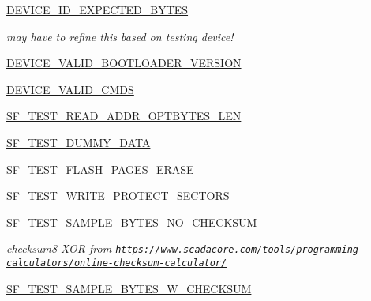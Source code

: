 \begin{DoxyCompactItemize}
\item 
\hyperlink{namespacestm__tools_1_1tests_1_1serialflasher__test_a65284c078af378de62bae59ea3f26d55}{D\+E\+V\+I\+C\+E\+\_\+\+I\+D\+\_\+\+E\+X\+P\+E\+C\+T\+E\+D\+\_\+\+B\+Y\+T\+ES}
\begin{DoxyCompactList}\small\item\em may have to refine this based on testing device! \end{DoxyCompactList}\item 
\hyperlink{namespacestm__tools_1_1tests_1_1serialflasher__test_a6dc3bf26591dbf1524ea88bea719f0df}{D\+E\+V\+I\+C\+E\+\_\+\+V\+A\+L\+I\+D\+\_\+\+B\+O\+O\+T\+L\+O\+A\+D\+E\+R\+\_\+\+V\+E\+R\+S\+I\+ON}
\item 
\hyperlink{namespacestm__tools_1_1tests_1_1serialflasher__test_a1cc886c6cbb9f9d5e24d9a50e7e6f4d1}{D\+E\+V\+I\+C\+E\+\_\+\+V\+A\+L\+I\+D\+\_\+\+C\+M\+DS}
\item 
\hyperlink{namespacestm__tools_1_1tests_1_1serialflasher__test_a01f375b415f66f35dfba69587829cd16}{S\+F\+\_\+\+T\+E\+S\+T\+\_\+\+R\+E\+A\+D\+\_\+\+A\+D\+D\+R\+\_\+\+O\+P\+T\+B\+Y\+T\+E\+S\+\_\+\+L\+EN}
\item 
\hyperlink{namespacestm__tools_1_1tests_1_1serialflasher__test_a500ed3fc7e37f3d6ef1aa3c1520e5a82}{S\+F\+\_\+\+T\+E\+S\+T\+\_\+\+D\+U\+M\+M\+Y\+\_\+\+D\+A\+TA}
\item 
\hyperlink{namespacestm__tools_1_1tests_1_1serialflasher__test_abb4df72148579487a6a4cca767c149fa}{S\+F\+\_\+\+T\+E\+S\+T\+\_\+\+F\+L\+A\+S\+H\+\_\+\+P\+A\+G\+E\+S\+\_\+\+E\+R\+A\+SE}
\item 
\hyperlink{namespacestm__tools_1_1tests_1_1serialflasher__test_a8393d2c2c4b44a58c07eed3b14b2f6ad}{S\+F\+\_\+\+T\+E\+S\+T\+\_\+\+W\+R\+I\+T\+E\+\_\+\+P\+R\+O\+T\+E\+C\+T\+\_\+\+S\+E\+C\+T\+O\+RS}
\item 
\hyperlink{namespacestm__tools_1_1tests_1_1serialflasher__test_ae1c42892dad519b503ef9a55a93aa16e}{S\+F\+\_\+\+T\+E\+S\+T\+\_\+\+S\+A\+M\+P\+L\+E\+\_\+\+B\+Y\+T\+E\+S\+\_\+\+N\+O\+\_\+\+C\+H\+E\+C\+K\+S\+UM}
\begin{DoxyCompactList}\small\item\em checksum8 X\+OR from \href{https://www.scadacore.com/tools/programming-calculators/online-checksum-calculator/}{\tt https\+://www.\+scadacore.\+com/tools/programming-\/calculators/online-\/checksum-\/calculator/} \end{DoxyCompactList}\item 
\hyperlink{namespacestm__tools_1_1tests_1_1serialflasher__test_afc86f38307068be6936b96ab60ddc7af}{S\+F\+\_\+\+T\+E\+S\+T\+\_\+\+S\+A\+M\+P\+L\+E\+\_\+\+B\+Y\+T\+E\+S\+\_\+\+W\+\_\+\+C\+H\+E\+C\+K\+S\+UM}
\end{DoxyCompactItemize}


